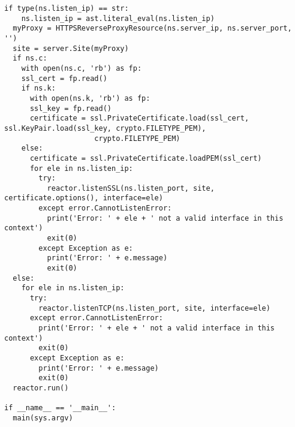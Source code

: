 \begin{lstlisting}[style=PythonStyle]
  if type(ns.listen_ip) == str:
    ns.listen_ip = ast.literal_eval(ns.listen_ip)
  myProxy = HTTPSReverseProxyResource(ns.server_ip, ns.server_port, '')
  site = server.Site(myProxy)
  if ns.c:
    with open(ns.c, 'rb') as fp:
    ssl_cert = fp.read()
    if ns.k:
      with open(ns.k, 'rb') as fp:
      ssl_key = fp.read()
      certificate = ssl.PrivateCertificate.load(ssl_cert,     	 ssl.KeyPair.load(ssl_key, crypto.FILETYPE_PEM), 
      		     	 crypto.FILETYPE_PEM)
    else:
      certificate = ssl.PrivateCertificate.loadPEM(ssl_cert)
      for ele in ns.listen_ip:
        try:
          reactor.listenSSL(ns.listen_port, site,          	certificate.options(), interface=ele)
        except error.CannotListenError:
          print('Error: ' + ele + ' not a valid interface in this context')
          exit(0)
        except Exception as e:
          print('Error: ' + e.message)
          exit(0)
  else:
    for ele in ns.listen_ip:
      try:
        reactor.listenTCP(ns.listen_port, site, interface=ele)
      except error.CannotListenError:
        print('Error: ' + ele + ' not a valid interface in this context')
        exit(0)
      except Exception as e:
        print('Error: ' + e.message)
        exit(0)
  reactor.run()

if __name__ == '__main__':
  main(sys.argv)
\end{lstlisting}

